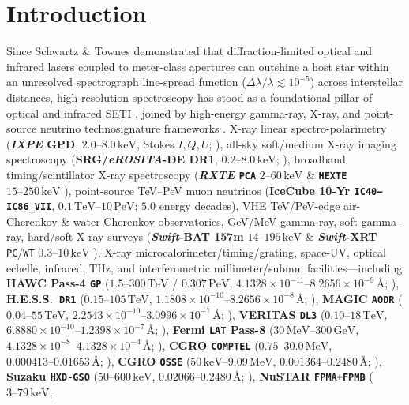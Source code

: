 \documentclass[twocolumn,10pt]{article}
\begin{document}
\section{Introduction}
Since Schwartz \& Townes \cite{SchwartzTownes1961} demonstrated that diffraction-limited optical and infrared lasers coupled to meter-class apertures can outshine a host star within an unresolved spectrograph line-spread function ($\Delta\lambda/\lambda \lesssim 10^{-5}$) across interstellar distances, high-resolution spectroscopy has stood as a foundational pillar of optical and infrared SETI \cite{Townes1983,ReinesMarcy2002,TellisMarcy2015,TellisMarcy2017,Lipman2019,Marcy2022,Zuckerman2023}, joined by high-energy gamma-ray, X-ray, and point-source neutrino technosignature frameworks \cite{Harris1986,Lacki2015,IceCube10YrData,Aartsen2020,Abbasi2022}. X-ray linear spectro-polarimetry (\textbf{\textit{IXPE} GPD}, $2.0\text{--}8.0\,\mathrm{keV}$, Stokes $I,Q,U$; \cite{Weisskopf2022,Kislat2015}), all-sky soft/medium X-ray imaging spectroscopy (\textbf{SRG/\textit{eROSITA}-DE DR1}, $0.2\text{--}8.0\,\mathrm{keV}$; \cite{Predehl2021,Merloni2024,Freund2024}), broadband timing/scintillator X-ray spectroscopy (\textbf{\textit{RXTE} \texttt{PCA}} $2\text{--}60\,\mathrm{keV}$ \cite{Jahoda2006} \& \textbf{\texttt{HEXTE}} $15\text{--}250\,\mathrm{keV}$ \cite{Rothschild1998}), point-source TeV--PeV muon neutrinos (\textbf{IceCube 10-Yr \texttt{IC40--IC86\_VII}}, $0.1\,\mathrm{TeV}\text{--}10\,\mathrm{PeV}$; $5.0$ energy decades), VHE TeV/PeV-edge air-Cherenkov \& water-Cherenkov observatories, GeV/MeV gamma-ray, soft gamma-ray, hard/soft X-ray surveys (\textbf{\textit{Swift}-BAT 157m} $14\text{--}195\,\mathrm{keV}$ \cite{Barthelmy2005,Lien2025} \& \textbf{\textit{Swift}-XRT} \texttt{PC}/\texttt{WT} $0.3\text{--}10\,\mathrm{keV}$ \cite{Burrows2005}), X-ray microcalorimeter/timing/grating, space-UV, optical echelle, infrared, THz, and interferometric millimeter/submm facilities---including \textbf{HAWC Pass-4 \texttt{GP}} ($1.5\text{--}300\,\mathrm{TeV}$ / $0.307\,\mathrm{PeV}$, $4.1328\times 10^{-11}\text{--}8.2656\times 10^{-9}\,\text{\AA}$; \cite{Abeysekara2017}), \textbf{H.E.S.S.\ \texttt{DR1}} ($0.15\text{--}105\,\mathrm{TeV}$, $1.1808\times 10^{-10}\text{--}8.2656\times 10^{-8}\,\text{\AA}$; \cite{Aharonian2006}), \textbf{MAGIC \texttt{AODR}} ($0.04\text{--}55\,\mathrm{TeV}$, $2.2543\times 10^{-10}\text{--}3.0996\times 10^{-7}\,\text{\AA}$; \cite{Aleksic2016}), \textbf{VERITAS \texttt{DL3}} ($0.10\text{--}18\,\mathrm{TeV}$, $6.8880\times 10^{-10}\text{--}1.2398\times 10^{-7}\,\text{\AA}$; \cite{Holder2006}), \textbf{Fermi \texttt{LAT} Pass-8} ($30\,\mathrm{MeV}\text{--}300\,\mathrm{GeV}$, $4.1328\times 10^{-8}\text{--}4.1328\times 10^{-4}\,\text{\AA}$; \cite{Atwood2009}), \textbf{CGRO \texttt{COMPTEL}} ($0.75\text{--}30.0\,\mathrm{MeV}$, $0.000413\text{--}0.01653\,\text{\AA}$; \cite{Schonfelder1993}), \textbf{CGRO \texttt{OSSE}} ($50\,\mathrm{keV}\text{--}9.09\,\mathrm{MeV}$, $0.001364\text{--}0.2480\,\text{\AA}$; \cite{Johnson1993}), \textbf{Suzaku \texttt{HXD-GSO}} ($50\text{--}600\,\mathrm{keV}$, $0.02066\text{--}0.2480\,\text{\AA}$; \cite{Mitsuda2007,Takahashi2007}), \textbf{NuSTAR \texttt{FPMA+FPMB}} ($3\text{--}79\,\mathrm{keV}$, 
\end{document}
